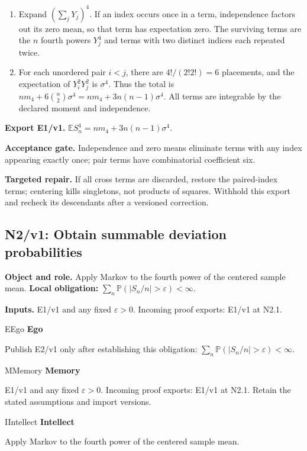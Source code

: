 \documentclass[preprint,12pt,aps,pra,showkeys,amsmath,amssymb,superscriptaddress,floatfix]{revtex4-2}
\theoremstyle{definition}
\theoremstyle{remark}
\newcommand{\mmfaculty}[3]{%
 \begin{mmfacultybox}{#1}{#2}
 {\sffamily\bfseries\color{MMBlue}#2}\par\smallskip #3
 \end{mmfacultybox}}
\newcommand{\field}[2]{\par\smallskip\noindent\textbf{#1.} #2\par}
\begin{document}
\begin{enumerate}[label=N1.\arabic*,leftmargin=3.4em]

\item Expand \((\sum_jY_j)^4\). If an index occurs once in a term,
independence factors out its zero mean, so that term has expectation
zero. The surviving terms are the \(n\) fourth powers \(Y_j^4\) and
terms with two distinct indices each repeated twice.

\item For each unordered pair \(i<j\), there are \(4!/(2!2!)=6\) placements,
and the expectation of \(Y_i^2Y_j^2\) is \(\sigma^4\). Thus the total is
\(n m_4+6\binom n2\sigma^4=n m_4+3n(n-1)\sigma^4\). All terms are
integrable by the declared moment and independence.

\end{enumerate}

\field{Export E1/v1}{\(\mathbb ES_n^4=n m_4+3n(n-1)\sigma^4\).}

\field{Acceptance gate}{Independence and zero means eliminate terms with any index appearing
exactly once; pair terms have combinatorial coefficient six.}

\field{Targeted repair}{If all cross terms are discarded, restore the paired-index terms;
centering kills singletons, not products of squares. Withhold this
export and recheck its descendants after a versioned correction.}

\clearpage

\subsection{N2/v1: Obtain summable deviation probabilities}

\field{Object and role}{Apply Markov to the fourth power of the centered sample mean.
\textbf{Local obligation:}
\(\sum_n\mathbb P(|S_n/n|>\varepsilon)<\infty\).}

\field{Inputs}{E1/v1 and any fixed \(\varepsilon>0\). Incoming proof exports: E1/v1 at
N2.1.}

\mmfaculty{E}{Ego}{Publish E2/v1 only after establishing this obligation:
\(\sum_n\mathbb P(|S_n/n|>\varepsilon)<\infty\).}

\mmfaculty{M}{Memory}{E1/v1 and any fixed \(\varepsilon>0\). Incoming proof exports: E1/v1 at
N2.1. Retain the stated assumptions and import versions.}

\mmfaculty{I}{Intellect}{Apply Markov to the fourth power of the centered sample mean.}
\end{document}
